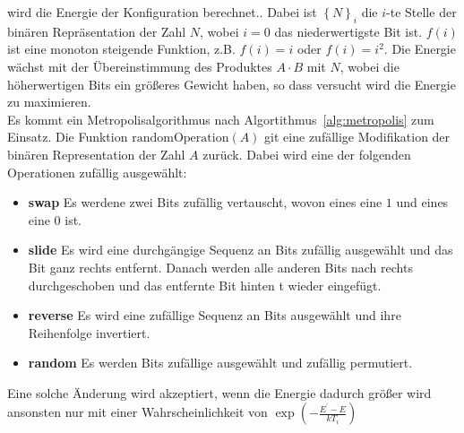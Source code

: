 wird die Energie der Konfiguration berechnet.. Dabei ist ${\left\{N\right\}}_i$ die $i$-te Stelle der binären Repräsentation der Zahl $N$, wobei $i=0$ das niederwertigste Bit ist. $f\left(i\right)$ ist eine monoton steigende Funktion, z.B. $f\left(i\right)=i$ oder $f\left(i\right)=i^2$. Die Energie wächst mit der Übereinstimmung des Produktes $A\cdot B$ mit $N$, wobei die höherwertigen Bits ein größeres Gewicht haben, so dass versucht wird die Energie zu maximieren.\\
Es kommt ein Metropolisalgorithmus nach Algortithmus~\ref{alg:metropolis} zum Einsatz. Die Funktion $\mathrm{randomOperation}\left(A\right)$ git eine zufällige Modifikation der binären Representation der Zahl $A$ zurück. Dabei wird eine der folgenden Operationen zufällig ausgewählt:
\begin{itemize}
		\item \textbf{swap} Es werdene zwei Bits zufällig vertauscht, wovon eines eine $1$ und eines eine $0$ ist.
		\item \textbf{slide} Es wird eine durchgängige Sequenz an Bits zufällig ausgewählt und das Bit ganz rechts entfernt. Danach werden alle anderen Bits nach rechts durchgeschoben und das entfernte Bit hinten t wieder eingefügt.
		\item \textbf{reverse} Es wird eine zufällige Sequenz an Bits ausgewählt und ihre Reihenfolge invertiert.
		\item \textbf{random} Es werden Bits zufällige ausgewählt und zufällig permutiert.
\end{itemize}
Eine solche Änderung wird akzeptiert, wenn die Energie dadurch größer wird ansonsten nur mit einer Wahrscheinlichkeit von $\exp\left(-\frac{E^\prime-E}{k T_i}\right)$



\FloatBarrier{}
